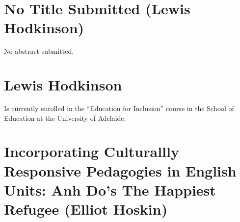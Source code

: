 \documentclass[twoside,12pt,a4paper,notitlepage]{memoir}
\begin{document}
\pagebreak
\section*{No Title Submitted (Lewis Hodkinson)}
\label{aut:hodkinson}

No abstract submitted.

\section*{Lewis Hodkinson}

Is currently enrolled in the ``Education for Inclusion'' course in the School of Education at the University of Adelaide.



\pagebreak
\section*{Incorporating Culturallly Responsive Pedagogies in English Units: Anh Do's The Happiest Refugee (Elliot Hoskin)}
\label{aut:hoskin}
\end{document}

